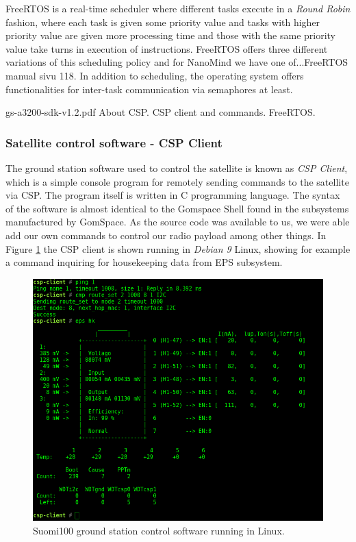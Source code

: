 \documentclass[english,12pt,a4paper,pdftex,elec,utf8]{aaltothesis}
\begin{document}
FreeRTOS is a real-time scheduler where different tasks execute in a \textit{Round Robin} fashion, where each task is given some priority value and tasks with higher priority value are given more processing time and those with the same priority value take turns in execution of instructions. FreeRTOS offers three different variations of this scheduling policy and for NanoMind we have one of...FreeRTOS manual sivu 118. In addition to scheduling, the operating system offers functionalities for inter-task communication via semaphores at least. \cite{freertosref}\par 
gs-a3200-sdk-v1.2.pdf
About CSP. CSP client and commands. FreeRTOS.\par

\subsubsection{Satellite control software - CSP Client}
The ground station software used to control the satellite is known as \textit{CSP Client}, which is a simple console program for remotely sending commands to the satellite via CSP. The program itself is written in C programming language. The syntax of the software is almost identical to the Gomspace Shell found in the subsystems manufactured by GomSpace. As the source code was available to us, we were able add our own commands to control our radio payload among other things. In Figure \ref{cspclient} the CSP client is shown running in \textit{Debian 9} Linux, showing for example a command inquiring for housekeeping data from EPS subsystem.\par 
\begin{figure}[h!]
\centering
\includegraphics[scale=0.3]{cspclient1}
\caption{Suomi100 ground station control software running in Linux.}
\label{cspclient}
\end{figure}
\end{document}
